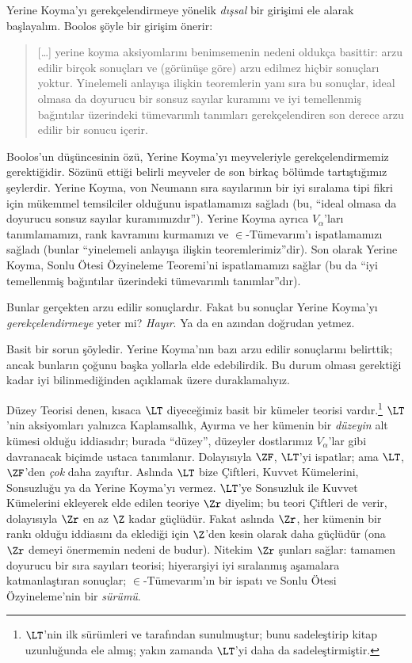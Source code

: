 \documentclass[../../../include/open-logic-section]{subfiles}
\begin{document}

Yerine Koyma'yı gerekçelendirmeye yönelik \emph{dışsal} bir girişimi ele
alarak başlayalım. Boolos şöyle bir girişim önerir:
\begin{quote}
  [\ldots] yerine koyma aksiyomlarını benimsemenin nedeni oldukça basittir:
  arzu edilir birçok sonuçları ve (görünüşe göre) arzu edilmez hiçbir
  sonuçları yoktur. Yinelemeli anlayışa ilişkin teoremlerin yanı sıra bu
  sonuçlar, ideal olmasa da doyurucu bir sonsuz sayılar kuramını ve iyi
  temellenmiş bağıntılar üzerindeki tümevarımlı tanımları gerekçelendiren son
  derece arzu edilir bir sonucu içerir.
  \citep[229]{Boolos1971}
\end{quote}		
Boolos'un düşüncesinin özü, Yerine Koyma'yı meyveleriyle gerekçelendirmemiz
gerektiğidir. Sözünü ettiği belirli meyveler de son birkaç bölümde
tartıştığımız şeylerdir. Yerine Koyma, von Neumann sıra sayılarının bir iyi
sıralama tipi fikri için mükemmel temsilciler olduğunu ispatlamamızı sağladı
(bu, ``ideal olmasa da doyurucu sonsuz sayılar kuramımızdır''). Yerine Koyma
ayrıca $V_\alpha$'ları tanımlamamızı, rank kavramını kurmamızı ve
$\in$-Tümevarım'ı ispatlamamızı sağladı (bunlar ``yinelemeli anlayışa ilişkin
teoremlerimiz''dir). Son olarak Yerine Koyma, Sonlu Ötesi Özyineleme
Teoremi'ni ispatlamamızı sağlar (bu da ``iyi temellenmiş bağıntılar üzerindeki
tümevarımlı tanımlar''dır).

Bunlar gerçekten arzu edilir sonuçlardır. Fakat bu sonuçlar Yerine Koyma'yı
\emph{gerekçelendirmeye} yeter mi? \emph{Hayır}. Ya da en azından doğrudan
yetmez.

Basit bir sorun şöyledir. Yerine Koyma'nın bazı arzu edilir sonuçlarını
belirttik; ancak bunların çoğunu başka yollarla elde edebilirdik. Bu durum
olması gerektiği kadar iyi bilinmediğinden açıklamak üzere duraklamalıyız.

Düzey Teorisi denen, kısaca $\LT$ diyeceğimiz basit bir kümeler teorisi
vardır.\footnote{$\LT$'nin ilk sürümleri \citet{Montague1965} ve
\citet{Scott1974} tarafından sunulmuştur; \citet{Potter2004} bunu
sadeleştirip kitap uzunluğunda ele almış; yakın zamanda \citet{ButtonLT1}
$\LT$'yi daha da sadeleştirmiştir.} $\LT$'nin aksiyomları yalnızca
Kaplamsallık, Ayırma ve her kümenin bir \emph{düzeyin} alt kümesi olduğu
iddiasıdır; burada ``düzey'', düzeyler dostlarımız $V_\alpha$'lar gibi
davranacak biçimde ustaca tanımlanır. Dolayısıyla $\ZF$, $\LT$'yi ispatlar;
ama $\LT$, $\ZF$'den \emph{çok} daha zayıftır. Aslında $\LT$ bize Çiftleri,
Kuvvet Kümelerini, Sonsuzluğu ya da Yerine Koyma'yı vermez. $\LT$'ye
Sonsuzluk ile Kuvvet Kümelerini ekleyerek elde edilen teoriye $\Zr$ diyelim;
bu teori Çiftleri de verir, dolayısıyla $\Zr$ en az $\Z$ kadar güçlüdür.
Fakat aslında $\Zr$, her kümenin bir rankı olduğu iddiasını da eklediği için
$\Z$'den kesin olarak daha güçlüdür (ona $\Zr$ demeyi önermemin nedeni de
budur). Nitekim $\Zr$ şunları sağlar: tamamen doyurucu bir sıra sayıları
teorisi; hiyerarşiyi iyi sıralanmış aşamalara katmanlaştıran sonuçlar;
$\in$-Tümevarım'ın bir ispatı ve Sonlu Ötesi Özyineleme'nin bir
\emph{sürümü}.
\end{document}
